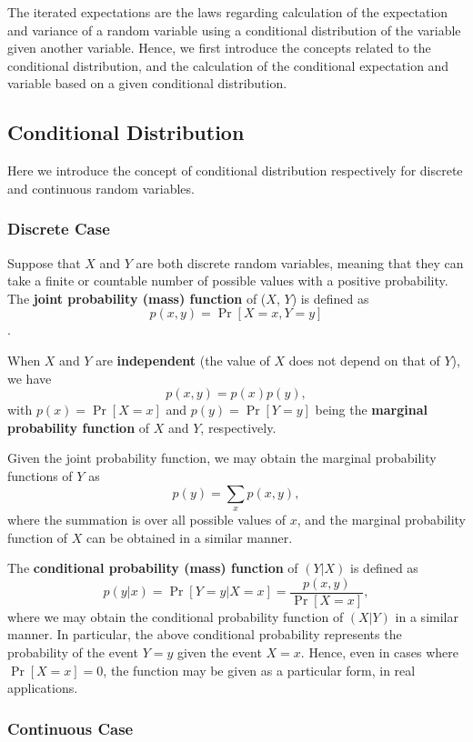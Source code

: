 \documentclass[]{book}
\theoremstyle{definition}
\theoremstyle{definition}
\theoremstyle{definition}
\theoremstyle{remark}
\begin{document}
The iterated expectations are the laws regarding calculation of the
expectation and variance of a random variable using a conditional
distribution of the variable given another variable. Hence, we first
introduce the concepts related to the conditional distribution, and the
calculation of the conditional expectation and variable based on a given
conditional distribution.

\subsection{Conditional Distribution}\label{conditional-distribution}

Here we introduce the concept of conditional distribution respectively
for discrete and continuous random variables.

\subsubsection{Discrete Case}\label{discrete-case}

Suppose that \(X\) and \(Y\) are both discrete random variables, meaning
that they can take a finite or countable number of possible values with
a positive probability. The \textbf{joint probability (mass) function}
of (\(X\), \(Y\)) is defined as \[p(x,y) = \Pr[X=x, Y=y]\].

When \(X\) and \(Y\) are \textbf{independent} (the value of \(X\) does
not depend on that of \(Y\)), we have \[p(x,y)=p(x)p(y),\] with
\(p(x)=\Pr[X=x]\) and \(p(y)=\Pr[Y=y]\) being the \textbf{marginal
probability function} of \(X\) and \(Y\), respectively.

Given the joint probability function, we may obtain the marginal
probability functions of \(Y\) as \[p(y)=\sum_x p(x,y),\] where the
summation is over all possible values of \(x\), and the marginal
probability function of \(X\) can be obtained in a similar manner.

The \textbf{conditional probability (mass) function} of \((Y|X)\) is
defined as \[p(y|x) =\Pr[Y=y|X=x]= \frac{p(x,y)}{\Pr[X=x]},\] where we
may obtain the conditional probability function of \((X|Y)\) in a
similar manner. In particular, the above conditional probability
represents the probability of the event \(Y=y\) given the event \(X=x\).
Hence, even in cases where \(\Pr[X=x]=0\), the function may be given as
a particular form, in real applications.

\subsubsection{Continuous Case}\label{continuous-case}
\end{document}

